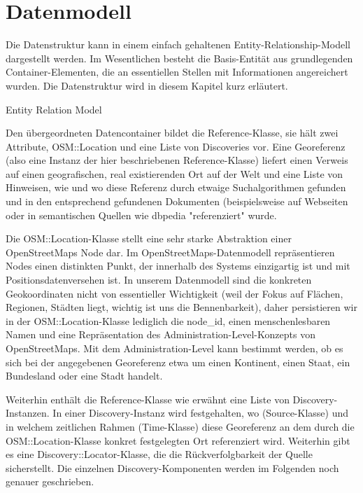 \section{Datenmodell}
\label{datenmodell}

Die Datenstruktur kann in einem einfach gehaltenen Entity-Relationship-Modell dargestellt werden. Im Wesentlichen besteht die Basis-Entität aus grundlegenden Container-Elementen, die an essentiellen Stellen mit Informationen angereichert wurden. Die Datenstruktur wird in diesem Kapitel kurz erläutert.

Entity Relation Model

Den übergeordneten Datencontainer bildet die Reference-Klasse, sie hält zwei Attribute, OSM::Location und eine Liste von Discoveries vor. Eine Georeferenz (also eine Instanz der hier beschriebenen Reference-Klasse) liefert einen Verweis auf einen geografischen, real existierenden Ort auf der Welt und eine Liste von Hinweisen, wie und wo diese Referenz durch etwaige Suchalgorithmen gefunden und in den entsprechend gefundenen Dokumenten (beispielsweise auf Webseiten oder in semantischen Quellen wie dbpedia "referenziert" wurde.

Die OSM::Location-Klasse stellt eine sehr starke Abstraktion einer OpenStreetMaps Node\cite{OSMnode} dar. Im OpenStreetMaps-Datenmodell repräsentieren Nodes einen distinkten Punkt, der innerhalb des Systems einzigartig ist und mit Positionsdatenversehen ist. In unserem Datenmodell sind die konkreten Geokoordinaten nicht von essentieller Wichtigkeit (weil der Fokus auf Flächen, Regionen, Städten liegt, wichtig ist uns die Bennenbarkeit), daher persistieren wir in der OSM::Location-Klasse lediglich die node\_id, einen menschenlesbaren Namen und eine Repräsentation des Administration-Level-Konzepts von OpenStreetMaps\cite{OSMadminlevel}. Mit dem Administration-Level kann bestimmt werden, ob es sich bei der angegebenen Georeferenz etwa um einen Kontinent, einen Staat, ein Bundesland oder eine Stadt handelt.

Weiterhin enthält die Reference-Klasse wie erwähnt eine Liste von Discovery-Instanzen. In einer Discovery-Instanz wird festgehalten, wo (Source-Klasse) und in welchem zeitlichen Rahmen (Time-Klasse) diese Georeferenz an dem durch die OSM::Location-Klasse konkret festgelegten Ort referenziert wird. Weiterhin gibt es eine Discovery::Locator-Klasse, die die Rückverfolgbarkeit der Quelle sicherstellt. Die einzelnen Discovery-Komponenten werden im Folgenden noch genauer geschrieben.

